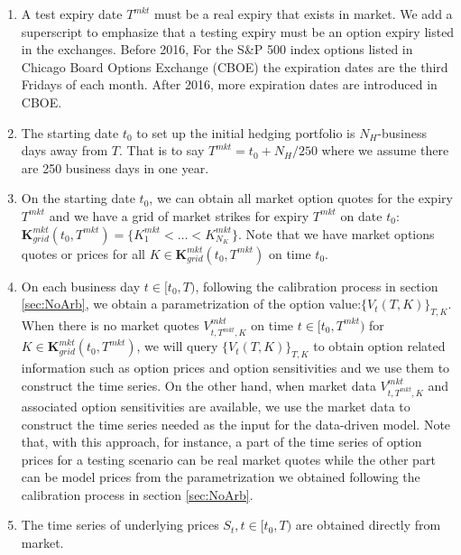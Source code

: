\documentclass[letterpaper,12pt,titlepage,oneside,final]{book}
\numberwithin{equation}{section}
\theoremstyle{definition}
\begin{document}
\begin{enumerate}
	\item A test expiry date $T^{mkt}$ must be a real expiry that exists in market. We add a superscript to emphasize that a testing expiry must be an option expiry listed in the exchanges. Before 2016, For the S\&P 500 index options listed in Chicago Board Options Exchange (CBOE) the expiration dates are the third Fridays of each month. After 2016, more expiration dates are introduced in CBOE.
	\item The starting date $t_0$ to set up the initial hedging portfolio is  $N_H$-business days away from $T$. That is to say $T^{mkt}=t_0+N_H/250$ where we assume there are 250 business days in one year. 
	\item On the starting date $t_0$, we can obtain all market option quotes for the expiry  $T^{mkt}$ and we have a grid of market strikes for expiry $T^{mkt}$ on date $t_0$:
	$\mathbf{K}^{mkt}_{grid}(t _0,T^{mkt})=\{K^{mkt}_1<\dots<K^{mkt}_{N_K}\}$. Note that we have market options quotes or prices for all $K \in \mathbf{K}^{mkt}_{grid}(t _0,T^{mkt})$ on time $t_0$.
	\item On each business day $t \in [t _0,T)$, following the calibration process in section \ref{sec:NoArb}, we  obtain a parametrization of the option value:$\{V_{t}(T,K)\}_{T,K}$. 
	When there is no  market quotes $V^{mkt}_{t,T^{mkt},K}$ on time $t \in [t _0, T^{mkt})$ for $K \in \mathbf{K}^{mkt}_{grid}(t _0,T^{mkt})$, we will query $\{V_{t}(T,K)\}_{T,K}$ to obtain  option related information such as option prices and option sensitivities and we use them to construct the time series. On the other hand, when market data $V^{mkt}_{t,T^{mkt},K}$ and associated option sensitivities  are available, we use the market data to construct the time series needed as the input for the data-driven model. Note that, with this approach, for instance, a part  of the time series of option prices for a testing scenario can be real market quotes while the other part can be model prices from the  parametrization we obtained following the calibration process in section \ref{sec:NoArb}.
	\item The time series of underlying prices $S_t, t \in[t_0,T)$ are obtained directly from market. 
	

\end{enumerate}
\end{document}
